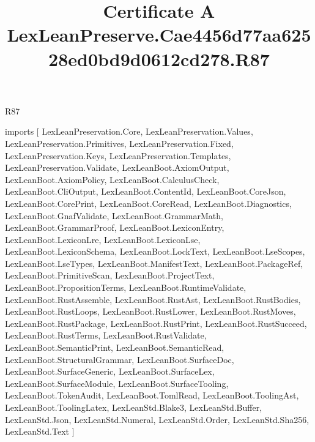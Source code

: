 \begin{lexlean}{R87}
\title{Certificate A LexLeanPreserve.Cae4456d77aa62528ed0bd9d0612cd278.R87}
\begin{coremodule}
imports [
  LexLeanPreservation.Core,
  LexLeanPreservation.Values,
  LexLeanPreservation.Primitives,
  LexLeanPreservation.Fixed,
  LexLeanPreservation.Keys,
  LexLeanPreservation.Templates,
  LexLeanPreservation.Validate,
  LexLeanBoot.AxiomOutput,
  LexLeanBoot.AxiomPolicy,
  LexLeanBoot.CalculusCheck,
  LexLeanBoot.CliOutput,
  LexLeanBoot.ContentId,
  LexLeanBoot.CoreJson,
  LexLeanBoot.CorePrint,
  LexLeanBoot.CoreRead,
  LexLeanBoot.Diagnostics,
  LexLeanBoot.GnafValidate,
  LexLeanBoot.GrammarMath,
  LexLeanBoot.GrammarProof,
  LexLeanBoot.LexiconEntry,
  LexLeanBoot.LexiconLre,
  LexLeanBoot.LexiconLse,
  LexLeanBoot.LexiconSchema,
  LexLeanBoot.LockText,
  LexLeanBoot.LseScopes,
  LexLeanBoot.LseTypes,
  LexLeanBoot.ManifestText,
  LexLeanBoot.PackageRef,
  LexLeanBoot.PrimitiveScan,
  LexLeanBoot.ProjectText,
  LexLeanBoot.PropositionTerms,
  LexLeanBoot.RuntimeValidate,
  LexLeanBoot.RustAssemble,
  LexLeanBoot.RustAst,
  LexLeanBoot.RustBodies,
  LexLeanBoot.RustLoops,
  LexLeanBoot.RustLower,
  LexLeanBoot.RustMoves,
  LexLeanBoot.RustPackage,
  LexLeanBoot.RustPrint,
  LexLeanBoot.RustSucceed,
  LexLeanBoot.RustTerms,
  LexLeanBoot.RustValidate,
  LexLeanBoot.SemanticPrint,
  LexLeanBoot.SemanticRead,
  LexLeanBoot.StructuralGrammar,
  LexLeanBoot.SurfaceDoc,
  LexLeanBoot.SurfaceGeneric,
  LexLeanBoot.SurfaceLex,
  LexLeanBoot.SurfaceModule,
  LexLeanBoot.SurfaceTooling,
  LexLeanBoot.TokenAudit,
  LexLeanBoot.TomlRead,
  LexLeanBoot.ToolingAst,
  LexLeanBoot.ToolingLatex,
  LexLeanStd.Blake3,
  LexLeanStd.Buffer,
  LexLeanStd.Json,
  LexLeanStd.Numeral,
  LexLeanStd.Order,
  LexLeanStd.Sha256,
  LexLeanStd.Text
]


\end{coremodule}
\end{lexlean}
